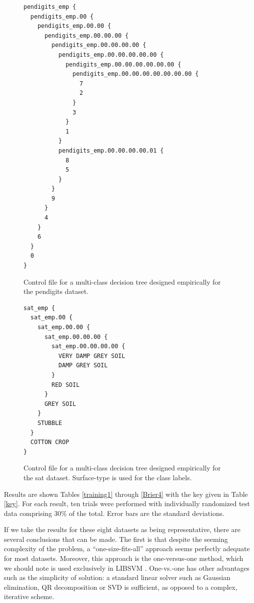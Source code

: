 \begin{figure}[htp]
	\begin{boxedminipage}{\textwidth}
		\begin{small}
		\begin{verbatim}
pendigits_emp {
  pendigits_emp.00 {
    pendigits_emp.00.00 {
      pendigits_emp.00.00.00 {
        pendigits_emp.00.00.00.00 {
          pendigits_emp.00.00.00.00.00 {
            pendigits_emp.00.00.00.00.00.00 {
              pendigits_emp.00.00.00.00.00.00.00 {
                7
                2
              }
              3
            }
            1
          }
          pendigits_emp.00.00.00.00.01 {
            8
            5
          }
        }
        9
      }
      4
    }
    6
  }
  0
}
		\end{verbatim}
		\end{small}
	\end{boxedminipage}
	\caption{Control file for a multi-class decision tree designed empirically for the pendigits dataset.}
	\label{pendigits}
\end{figure}

\begin{figure}[htp]
	\begin{boxedminipage}{\textwidth}
		\begin{small}
		\begin{verbatim}
sat_emp {
  sat_emp.00 {
    sat_emp.00.00 {
      sat_emp.00.00.00 {
        sat_emp.00.00.00.00 {
          VERY DAMP GREY SOIL
          DAMP GREY SOIL
        }
        RED SOIL
      }
      GREY SOIL
    }
    STUBBLE
  }
  COTTON CROP
}
		\end{verbatim}
		\end{small}
	\end{boxedminipage}
	\caption{Control file for a multi-class decision tree designed empirically for the sat dataset. Surface-type is used for the class labels.}
	\label{sat}
\end{figure}


Results are shown Tables \ref{training1} through \ref{Brier4} with the
key given in Table \ref{key}.
For each result, ten trials were performed with individually randomized 
test data comprising 30\% of the total.
Error bars are the standard deviations.

If we take the results for these eight datasets as being representative,
there are several conclusions that can be made.
The first is that despite the seeming complexity of the problem, a 
``one-size-fits-all'' approach seems perfectly adequate for most datasets.
Moreover, this approach is the one-versus-one method,
which we should note is used exclusively in LIBSVM \citep{Chang_Lin2011}.
One-vs.-one has other advantages such as the simplicity of solution:
a standard linear solver such as Gaussian elimination,
QR decomposition or SVD is sufficient,
as opposed to a complex, iterative scheme.

